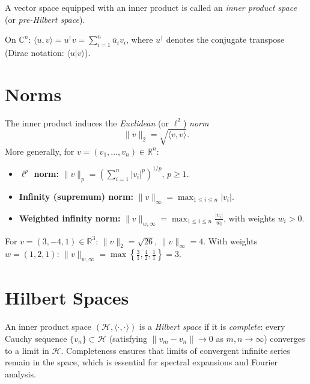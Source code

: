 A vector space equipped with an inner product is called an \emph{inner product space} (or \emph{pre-Hilbert space}).

\begin{example}
On $\mathbb{C}^n$: $\langle u,v\rangle = u^\dagger v = \sum_{i=1}^n \bar{u}_i v_i$, where $u^\dagger$ denotes the conjugate transpose (Dirac notation: $\langle u|v\rangle$).
\end{example}

\section{Norms}
\label{sec:norms}

The inner product induces the \emph{Euclidean} (or $\ell^2$) \emph{norm}
\[
  \|v\|_2 = \sqrt{\langle v,v\rangle}.
\]
More generally, for $v=(v_1,\ldots,v_n)\in\mathbb{R}^n$:

\begin{itemize}
  \item \textbf{$\ell^p$ norm:} $\displaystyle\|v\|_p = \left(\sum_{i=1}^n |v_i|^p\right)^{1/p}$, $p\geq 1$.
  \item \textbf{Infinity (supremum) norm:} $\displaystyle\|v\|_\infty = \max_{1\leq i\leq n}|v_i|$.
  \item \textbf{Weighted infinity norm:} $\displaystyle\|v\|_{w,\infty} = \max_{1\leq i\leq n} \frac{|v_i|}{w_i}$, with weights $w_i>0$.
\end{itemize}

\begin{example}
For $v=(3,-4,1)\in\mathbb{R}^3$: $\|v\|_2=\sqrt{26}$, $\|v\|_\infty=4$. With weights $w=(1,2,1)$: $\|v\|_{w,\infty}=\max\!\left\{\tfrac{3}{1},\tfrac{4}{2},\tfrac{1}{1}\right\}=3$.
\end{example}

\section{Hilbert Spaces}
\label{sec:hilbert}

An inner product space $(\mathcal{H},\langle\cdot,\cdot\rangle)$ is a \emph{Hilbert space} if it is \emph{complete}: every Cauchy sequence $\{v_n\}\subset\mathcal{H}$ (satisfying $\|v_m-v_n\|\to0$ as $m,n\to\infty$) converges to a limit in $\mathcal{H}$. Completeness ensures that limits of convergent infinite series remain in the space, which is essential for spectral expansions and Fourier analysis.


